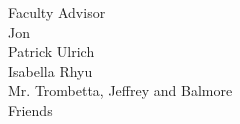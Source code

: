

Faculty Advisor \\

Jon \\

Patrick Ulrich \\

Isabella Rhyu \\

Mr. Trombetta, Jeffrey and Balmore \\

Friends

